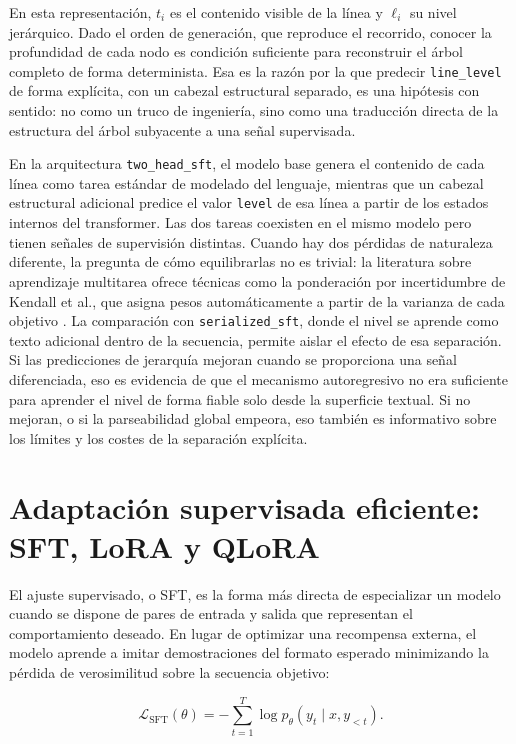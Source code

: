 En esta representación, \(t_i\) es el contenido visible de la línea y \(\ell_i\) su nivel jerárquico. Dado el orden de generación, que reproduce el recorrido, conocer la profundidad de cada nodo es condición suficiente para reconstruir el árbol completo de forma determinista. Esa es la razón por la que predecir \texttt{line\_level} de forma explícita, con un cabezal estructural separado, es una hipótesis con sentido: no como un truco de ingeniería, sino como una traducción directa de la estructura del árbol subyacente a una señal supervisada.

En la arquitectura \texttt{two\_head\_sft}, el modelo base genera el contenido de cada línea como tarea estándar de modelado del lenguaje, mientras que un cabezal estructural adicional predice el valor \texttt{level} de esa línea a partir de los estados internos del transformer. Las dos tareas coexisten en el mismo modelo pero tienen señales de supervisión distintas. Cuando hay dos pérdidas de naturaleza diferente, la pregunta de cómo equilibrarlas no es trivial: la literatura sobre aprendizaje multitarea ofrece técnicas como la ponderación por incertidumbre de Kendall et al., que asigna pesos automáticamente a partir de la varianza de cada objetivo \citep{kendall2018multitask}. La comparación con \texttt{serialized\_sft}, donde el nivel se aprende como texto adicional dentro de la secuencia, permite aislar el efecto de esa separación. Si las predicciones de jerarquía mejoran cuando se proporciona una señal diferenciada, eso es evidencia de que el mecanismo autoregresivo no era suficiente para aprender el nivel de forma fiable solo desde la superficie textual. Si no mejoran, o si la parseabilidad global empeora, eso también es informativo sobre los límites y los costes de la separación explícita.

\section{Adaptación supervisada eficiente: SFT, LoRA y QLoRA}
\label{sec:estado-arte-sft-lora}

El ajuste supervisado, o SFT, es la forma más directa de especializar un modelo cuando se dispone de pares de entrada y salida que representan el comportamiento deseado. En lugar de optimizar una recompensa externa, el modelo aprende a imitar demostraciones del formato esperado minimizando la pérdida de verosimilitud sobre la secuencia objetivo:

\[
\mathcal{L}_{\mathrm{SFT}}(\theta) =
-\sum_{t=1}^{T}\log p_\theta(y_t \mid x, y_{<t}).
\]

